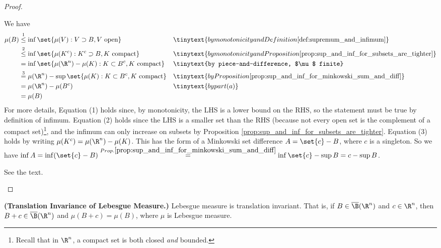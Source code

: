 \documentclass{article} %
\begin{document}
\begin{proof}
\begin{alphabate}
We have 
\begin{align*}
\mu(B) & \stackrel{1}{\leq}	\inf \set{\mu(V) : V \supset B, V \text{ open}} && \tinytext{by monotonicity and Definition \ref{def:supremum_and_infimum}} \\
 & \stackrel{2}{\leq}	\inf \set{\mu(K^c) : K^c \supset B, K \text{ compact}} && \tinytext{by monotonicity and Proposition \ref{prop:sup_and_inf_for_subsets_are_tighter}} \\
 &= \inf \set{\mu(\R^n) - \mu(K) : K \subset B^c, K \text{ compact}} && \tinytext{by piece-and-difference, $\mu$ finite} \\
 & \stackrel{3}{=}	\mu(\R^n) - \sup \set{\mu(K) : K \subset B^c, K \text{ compact}} && \tinytext{by Proposition \ref{prop:sup_and_inf_for_minkowski_sum_and_diff}} \\
  & =	\mu(\R^n) - \mu(B^c)  && \tinytext{by part (a)}\\
&= \mu(B)
\end{align*}
For more details, Equation (1) holds since, by monotonicity, the LHS is a lower bound on the RHS, so the statement must be true by definition of infimum. Equation (2) holds since the LHS is a smaller set than the RHS (because not every open set is the complement of a compact set)\footnote{Recall that in $\R^n$, a compact set is both closed \textit{and} bounded.}, and the infimum can only increase on subsets by Proposition \ref{prop:sup_and_inf_for_subsets_are_tighter}. Equation (3) holds by writing $\mu(K^c) = \mu(\R^n) - \mu(K)$.  This has the form of a Minkowski set difference $A = \set{c} - B$, where $c$ is a singleton.  So we have $\inf A = \inf ( \set{c} - B) \stackrel{Prop. \ref{prop:sup_and_inf_for_minkowski_sum_and_diff}}{=} \inf \set{c} - \sup B = c - \sup B$. 
\item See the text.
\end{alphabate}
 
 \end{proof}


\begin{proposition}
\textbf{(Translation Invariance of Lebesgue Measure.)} Lebesgue measure is translation invariant.  That is, if $B \in \overline{\B}(\R^n)$ and $c \in \R^n$, then $B+c \in  \overline{\B}(\R^n)$ and $\mu(B+c)=\mu(B)$, where $\mu$ is Lebesgue measure.	
\label{prop:Lebesgue_measure_is_translation_invariant}
\end{proposition}
\end{document}
